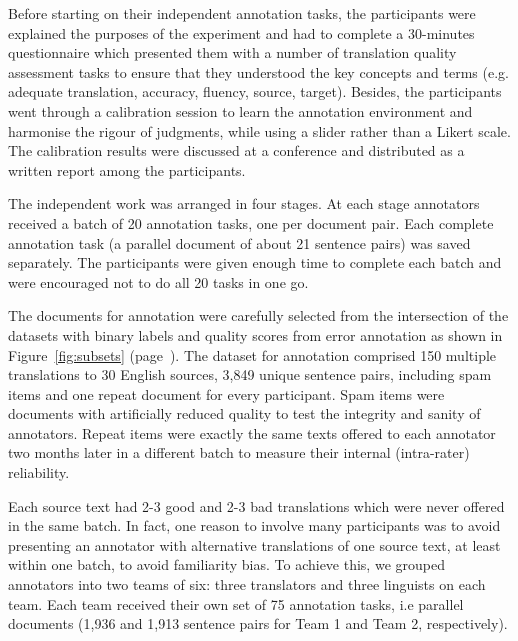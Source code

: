 
Before starting on their independent annotation tasks, the participants were explained the purposes of the experiment and had to complete a 30-minutes questionnaire which presented them with a number of translation quality assessment tasks to ensure that they understood the key concepts and terms (e.g. adequate translation, accuracy, fluency, source, target).
Besides, the participants went through a calibration session to learn the annotation environment and harmonise the rigour of judgments, while using a slider rather than a Likert scale. 
The calibration results were discussed at a conference and distributed as a written report among the participants.

The independent work was arranged in four stages. At each stage annotators received a batch of 20 annotation tasks, one per document pair. Each complete annotation task (a parallel document of about 21 sentence pairs) was saved separately. The participants were given enough time to complete each batch and were encouraged not to do all 20 tasks in one go.

\label{pg:intersection140}
The documents for annotation were carefully selected from the intersection of the datasets with binary labels and quality scores from error annotation as shown in Figure~\ref{fig:subsets} (page~\pageref{pg:subsets}). The dataset for annotation comprised 150 multiple translations to 30 English sources, 3,849 unique sentence pairs, including spam items and one repeat document for every participant. 
Spam items were documents with artificially reduced quality to test the integrity and sanity of annotators. Repeat items were exactly the same texts offered to each annotator two months later in a different batch to measure their internal (intra-rater) reliability.

Each source text had 2-3 good and 2-3 bad translations which were never offered in the same batch. In fact, one reason to involve many participants was to avoid presenting an annotator with alternative translations of one source text, at least within one batch, to avoid familiarity bias. To achieve this, we grouped annotators into two teams of six: three translators and three linguists on each team. Each team received their own set of 75 annotation tasks, i.e parallel documents (1,936 and 1,913 sentence pairs for Team 1 and Team 2, respectively). 

